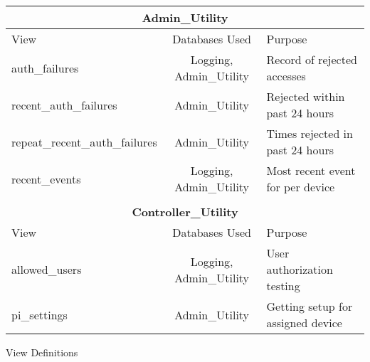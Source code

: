 \begin{databaseTable}
    \setlength{\tabcolsep}{16pt}
    \begin{tabular}{l c l}
        \multicolumn{3}{c}{\textbf{Admin\_Utility}} \\
        \toprule
        View & Databases Used & Purpose \\
        \cmidrule(lr){1-3}
        auth\_failures & Logging, \hspace{0.1em} Admin\_Utility & Record of rejected accesses \\
        recent\_auth\_failures & Admin\_Utility & Rejected within past 24 hours \\
        repeat\_recent\_auth\_failures & Admin\_Utility & Times rejected in past 24 hours \\
        recent\_events & Logging, \hspace{0.1em} Admin\_Utility & Most recent event for per device \\
        \bottomrule \\
        \multicolumn{3}{c}{\textbf{Controller\_Utility}} \\
        \toprule
        View & Databases Used & Purpose \\
        \cmidrule(lr){1-3}
        allowed\_users & Logging, \hspace{0.1em} Admin\_Utility & User authorization testing \\
        pi\_settings & Admin\_Utility & Getting setup for assigned device \\
        \bottomrule
    \end{tabular}
    \caption{View Definitions}
    \label{table: view_defs}
\end{databaseTable}